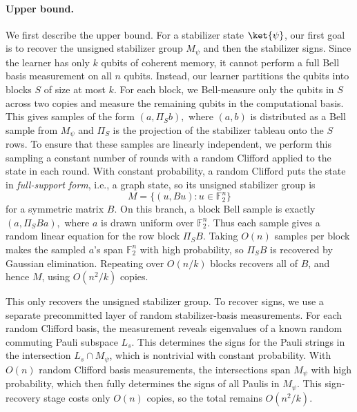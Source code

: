 \documentclass[11pt]{article}
\newcommand{\F}{\mathbb{F}}
\begin{document}
\paragraph{Upper bound.}
We first describe the upper bound. For a stabilizer state $\ket{\psi}$, our first goal  is to recover the unsigned
stabilizer group $M_\psi$ and then the stabilizer signs.  Since the learner has
only $k$ qubits of coherent memory, it cannot perform a full Bell basis measurement on all $n$ qubits.  Instead, our learner partitions the qubits into blocks $S$ of size at most $k$. For each block, we Bell-measure only the qubits in $S$ across two copies and measure the remaining qubits in the computational basis.  This gives
samples of the form
$
    (a,\Pi_S b),
$
where $(a,b)$ is distributed as a Bell sample from $M_\psi$ and $\Pi_S$ is the projection of the stabilizer tableau onto the $S$ rows. To ensure that these samples are linearly independent, we perform this sampling a constant number of rounds with a random Clifford applied to the state in each round.  With constant probability, a random Clifford puts the state in \emph{full-support form}, i.e., a graph state, so its unsigned stabilizer group is
$$
    M=\{(u,Bu):u\in\F_2^n\}
$$
for a symmetric matrix $B$.  On this branch, a block Bell sample is exactly
$
    (a,\Pi_S Ba),
$
where $a$ is drawn uniform over $\F_2^n$.  Thus each sample gives a random linear equation for the row block $\Pi_S B$.  Taking $O(n)$ samples per block makes the sampled $a$'s span $\F_2^n$ with high probability, so $\Pi_S B$ is recovered by Gaussian elimination.  Repeating over $O(n/k)$ blocks recovers all of $B$, and hence $M$, using $O(n^2/k)$ copies.  

This only recovers the unsigned stabilizer group.  To recover signs, we use a separate precommitted layer of random stabilizer-basis measurements. For each
random Clifford basis, the measurement reveals eigenvalues of a known random commuting Pauli subspace $L_s$. This determines the signs for the Pauli strings in the intersection $L_s \cap M_\psi$, which is nontrivial with constant probability. With $O(n)$ random Clifford basis measurements, the intersections span $M_\psi$ with high probability, which then fully determines the signs of all Paulis in $M_\psi$.  This sign-recovery stage costs only $O(n)$ copies, so the total remains $O(n^2/k)$.
\end{document}
